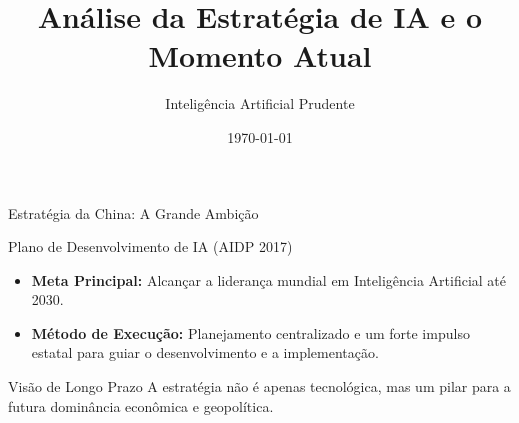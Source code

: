 \documentclass{beamer}
\title{Análise da Estratégia de IA e o Momento Atual}
\author{Inteligência Artificial Prudente}
\institute{UNESP}
\date{\today}
\begin{document}
\begin{frame}
    \titlepage
\end{frame}

\begin{frame}{Estratégia da China: A Grande Ambição}
    \begin{block}{Plano de Desenvolvimento de IA (AIDP 2017)}
        \begin{itemize}
            \item \textbf{Meta Principal:} Alcançar a liderança mundial em Inteligência Artificial até 2030.
            \item \textbf{Método de Execução:} Planejamento centralizado e um forte impulso estatal para guiar o desenvolvimento e a implementação.
        \end{itemize}
    \end{block}
    
    \begin{alertblock}{Visão de Longo Prazo}
        A estratégia não é apenas tecnológica, mas um pilar para a futura dominância econômica e geopolítica.
    \end{alertblock}
\end{frame}
\end{document}
